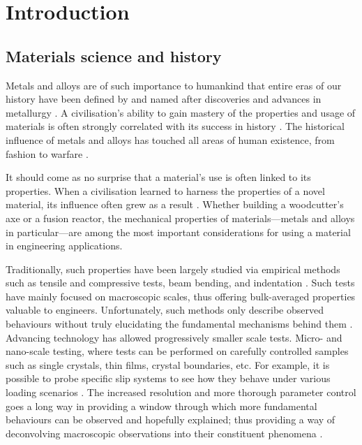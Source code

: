 \chapter{Introduction}
\label{c:intro}

\section{Materials science and history}
\label{s:matsci_history}

Metals and alloys are of such importance to humankind that entire eras of our history have been defined by and named after discoveries and advances in metallurgy \cite{metals_prehistory1, metals_prehistory2}. A civilisation's ability to gain mastery of the properties and usage of materials is often strongly correlated with its success in history \cite{metals_success1}. The historical influence of metals and alloys has touched all areas of human existence, from fashion to warfare \cite{metals_social}.

It should come as no surprise that a material's use is often linked to its properties. When a civilisation learned to harness the properties of a novel material, its influence often grew as a result \cite{guns_germs_steel, metals_success2}. Whether building a woodcutter's axe or a fusion reactor, the mechanical properties of materials---metals and alloys in particular---are among the most important considerations for using a material in engineering applications.

Traditionally, such properties have been largely studied via empirical methods such as tensile and compressive tests, beam bending, and indentation \cite{tensile_test_theory, bending_test_theory, indentation_theory}. Such tests have mainly focused on macroscopic scales, thus offering bulk-averaged properties valuable to engineers. Unfortunately, such methods only describe observed behaviours without truly elucidating the fundamental mechanisms behind them \cite{micromech_test1}. Advancing technology has allowed progressively smaller scale tests. Micro- and nano-scale testing, where tests can be performed on carefully controlled samples such as single crystals, thin films, crystal boundaries, etc. For example, it is possible to probe specific slip systems to see how they behave under various loading scenarios \cite{micromech_test2, micromech_test3}. The increased resolution and more thorough parameter control goes a long way in providing a window through which more fundamental behaviours can be observed and hopefully explained; thus providing a way of deconvolving macroscopic observations into their constituent phenomena \cite{micro_macro1, micro_macro2}.

